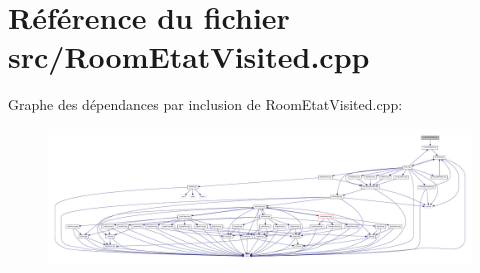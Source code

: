 \section{Référence du fichier src/\-Room\-Etat\-Visited.cpp}
\label{_room_etat_visited_8cpp}
Graphe des dépendances par inclusion de Room\-Etat\-Visited.\-cpp\-:
\nopagebreak
\begin{figure}[H]
\begin{center}
\leavevmode
\includegraphics[width=350pt]{_room_etat_visited_8cpp__incl}
\end{center}
\end{figure}
